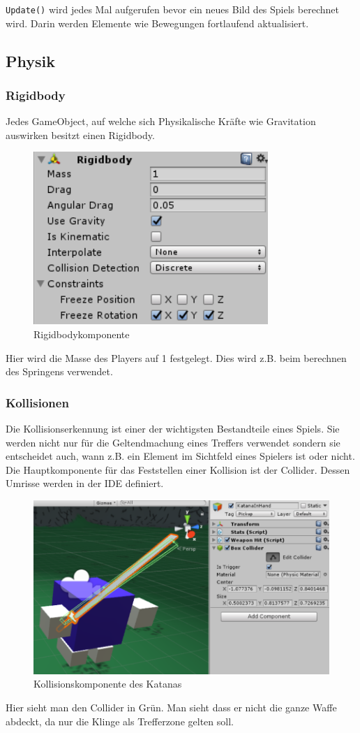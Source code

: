 \lstinline{Update()} wird jedes Mal aufgerufen bevor ein neues Bild des Spiels berechnet wird. Darin werden Elemente wie Bewegungen fortlaufend aktualisiert.
\subsection{Physik}

\subsubsection{Rigidbody}
Jedes GameObject, auf welche sich Physikalische Kräfte wie Gravitation auswirken besitzt einen Rigidbody.
\begin{figure}[H]
\includegraphics[scale=1]{screenshots/rigidbody.png}
\caption{Rigidbodykomponente}
\end{figure}
Hier wird die Masse des Players auf 1 festgelegt. Dies wird z.B. beim berechnen des Springens verwendet.

\subsubsection{Kollisionen}
\label{subsubsec:collider}
Die Kollisionserkennung ist einer der wichtigsten Bestandteile eines Spiels. Sie werden nicht nur für die Geltendmachung eines Treffers verwendet sondern sie entscheidet auch, wann z.B. ein Element im Sichtfeld eines Spielers ist oder nicht.
Die Hauptkomponente für das Feststellen einer Kollision ist der Collider.
Dessen Umrisse werden in der IDE definiert.
\begin{figure}[H]
\includegraphics[scale=0.8]{screenshots/katanacollider.png}
\caption{Kollisionskomponente des Katanas}
\end{figure}
Hier sieht man den Collider in Grün. Man sieht dass er nicht die ganze Waffe abdeckt, da nur die Klinge als Trefferzone gelten soll.

